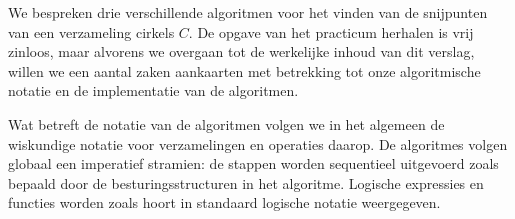 We bespreken drie verschillende algoritmen voor het vinden van de
snijpunten van een verzameling cirkels $C$. De opgave van het
practicum herhalen is vrij zinloos, maar alvorens we overgaan tot de
werkelijke inhoud van dit verslag, willen we een aantal zaken
aankaarten met betrekking tot onze algoritmische notatie en de
implementatie van de algoritmen.

Wat betreft de notatie van de algoritmen volgen we in het algemeen de
wiskundige notatie voor verzamelingen en operaties daarop. De
algoritmes volgen globaal een imperatief stramien: de stappen worden
sequentieel uitgevoerd zoals bepaald door de besturingsstructuren in
het algoritme. Logische expressies en functies worden zoals hoort in
standaard logische notatie weergegeven.